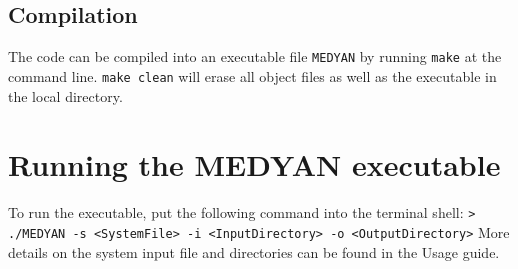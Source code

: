 \documentclass[11pt, oneside]{article}   	%
\begin{document}
\subsection{Compilation}

The code can be compiled into an executable file \texttt{MEDYAN} by running \texttt{make} at the command line. \texttt{make clean} will erase all object files as well as the executable in the local directory.

\section {Running the MEDYAN executable}

To run the executable, put the following command into the terminal shell: \newline \newline\indent \texttt{> ./MEDYAN -s <SystemFile> -i <InputDirectory> -o <OutputDirectory>} \newline \newline More details on the system input file and directories can be found in the Usage guide.
\end{document}

